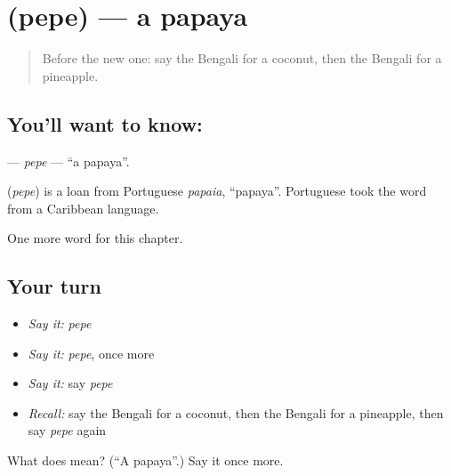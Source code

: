 \section[\texorpdfstring{\bn{পেঁপে} (pepe)}{পেঁপে (pepe)}]{ (pepe) — a papaya}

\label{lesson:BN-C115-pepe}



\begin{quote}
Before the new one: say the Bengali for a coconut, then the Bengali for a pineapple.
\end{quote}

\subsection*{You'll want to know: }
\textbf{} — \emph{pepe} — \textquotedblleft{}a papaya\textquotedblright{}.

\begin{cousinweb}
\textbf{} (\emph{pepe}) is a loan from Portuguese \emph{papaia}, \textquotedblleft{}papaya\textquotedblright{}. Portuguese took the word from a Caribbean language.
\end{cousinweb}

\begin{grammarlens}[title={What you've built}]
One more word for this chapter.
\end{grammarlens}

\subsection*{Your turn}
\begin{itemize}
\raggedright
  \item \emph{Say it:} \emph{pepe}
  \item \emph{Say it:} \emph{pepe}, once more
  \item \emph{Say it:} say \emph{pepe}
  \item \emph{Recall:} say the Bengali for a coconut, then the Bengali for a pineapple, then say \emph{pepe} again
\end{itemize}

\begin{tcolorbox}[breakable,colback=teal!4,colframe=teal!35!black,title={Before you move on}]
What does  mean? (\textquotedblleft{}A papaya\textquotedblright{}.) Say it once more.
\end{tcolorbox}
